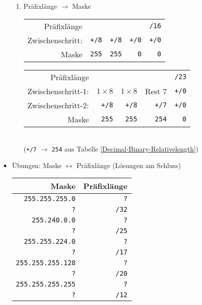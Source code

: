 \documentclass[a4paper,german]{scrartcl}
\begin{document}
\begin{itemize}
\begin{enumerate}
      \item Pr\"afixl\"ange $\rightarrow$ Maske
      \begin{center}
        \begin{tabular}{r|r r r r}
          Pr\"afixl\"ange & & & & \texttt{/16} \\
          Zwischenschritt: & \texttt{+/8} & \texttt{+/8} & \texttt{+/0} & \texttt{+/0} \\
          \hline
          Maske   & \texttt{255} & \texttt{255} & \texttt{0} & \texttt{0} \\
        \end{tabular}
      \end{center}
      \vspace{0.25cm}
      \begin{center}
        \begin{tabular}{r|r r r r}
          Pr\"afixl\"ange & & & & \texttt{/23} \\
          Zwischenschritt-1: & $1 \times 8$ & $1 \times 8$ & Rest $7$ & \texttt{+/0} \\
          Zwischenschritt-2: & \texttt{+/8} & \texttt{+/8} & \texttt{+/7} & \texttt{+/0} \\
          \hline
          Maske   & \texttt{255} & \texttt{255} & \texttt{254} & \texttt{0} \\
        \end{tabular}\\
      (\texttt{+/7} $\rightarrow$ \texttt{254} aus Tabelle \ref{Decimal-Binary-Relativelength})
      \end{center}
      \vspace{0.25cm}
    \end{enumerate}
%
\clearpage
  \item \"Ubungen: Maske $\leftrightarrow$ Pr\"afixl\"ange (L\"osungen am Schluss)
      \begin{center}
        \begin{tabular}{rr}
          Maske & Pr\"afixl\"ange \\
          \hline
          \texttt{255.255.255.0} & \texttt{?} \\
          \texttt{?}             & \texttt{/32} \\
          \texttt{255.240.0.0}   & \texttt{?} \\
          \texttt{?}             & \texttt{/25} \\
          \texttt{255.255.224.0} & \texttt{?} \\
          \texttt{?}             & \texttt{/17} \\
          \texttt{255.255.255.128} & \texttt{?} \\
          \texttt{?}             & \texttt{/20} \\
          \texttt{255.255.255.255} & \texttt{?} \\
          \texttt{?}             & \texttt{/12} \\
        \end{tabular}
      \end{center}
      \vspace{0.25cm}


\end{itemize}
\end{document}
